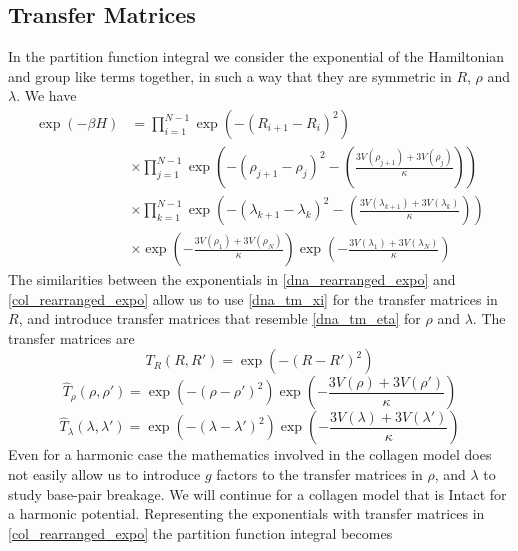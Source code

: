 \subsection{Transfer Matrices}
%
In the partition function integral we consider the exponential of the Hamiltonian and group like terms together, in such a way that they are symmetric in $R$, $\rho$ and $\lambda$. We have
%
\begin{align}\label{col_rearranged_expo}
\exp\left(-\beta H\right)&=\prod_{i=1}^{N-1}\exp\left(-\left(R_{i+1}-R_{i}\right)^{2}\right)\nonumber\\
&\times\prod_{j=1}^{N-1}\exp\left(-\left(\rho_{j+1}-\rho_{j}\right)^2 - \left(\frac{3V\left(\rho_{j+1}\right)+3V\left(\rho_{j}\right)}{\kappa}\right)\right)\nonumber\\
&\times \prod_{k=1}^{N-1}\exp\left(-\left(\lambda_{k+1}-\lambda_{k}\right)^2 - \left(\frac{3V\left(\lambda_{k+1}\right)+3V\left(\lambda_{k}\right)}{\kappa}\right)\right)\nonumber\\
&\times\exp\left(-\frac{3V\left(\rho_{1}\right)+3V\left(\rho_{N}\right)}{\kappa}\right)\exp\left(-\frac{3V\left(\lambda_{1}\right)+3V\left(\lambda_{N}\right)}{\kappa}\right)
\end{align}
%
The similarities between the exponentials in \eqref{dna_rearranged_expo} and \eqref{col_rearranged_expo} allow us to use \eqref{dna_tm_xi} for the transfer matrices in $R$, and introduce transfer matrices that resemble \eqref{dna_tm_eta} for $\rho$ and $\lambda$. The transfer matrices are
%
\begin{equation}\label{col_tm_r}
T_{R}\left(R,R'\right) = \exp\left(-\left(R-R'\right)^2\right)
\end{equation}
%
\begin{equation}\label{col_tm_rho}
\hat{T}_{\rho}\left(\rho,\rho'\right) = \exp\left(-\left(\rho-\rho'\right)^2\right)\exp\left(-\frac{3V(\rho)+3V(\rho')}{\kappa}\right)
\end{equation}
%
\begin{equation}\label{col_tm_lambda}
\hat{T}_{\lambda}\left(\lambda,\lambda'\right) = \exp\left(-\left(\lambda-\lambda'\right)^2\right)\exp\left(-\frac{3V(\lambda)+3V(\lambda')}{\kappa}\right)
\end{equation}
%
Even for a harmonic case the mathematics involved in the collagen model does not easily allow us to introduce $g$ factors to the transfer matrices in $\rho$, and $\lambda$ to study base-pair breakage. We will continue for a collagen model that is Intact for a harmonic potential. Representing the exponentials with transfer matrices in \eqref{col_rearranged_expo} the partition function integral becomes
